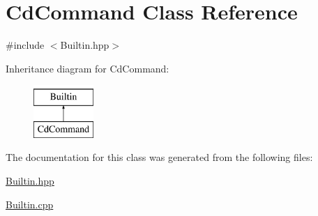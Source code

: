 \hypertarget{classCdCommand}{
\section{CdCommand Class Reference}
\label{classCdCommand}
}


{\ttfamily \#include $<$Builtin.hpp$>$}

Inheritance diagram for CdCommand:\begin{figure}[H]
\begin{center}
\leavevmode
\includegraphics[height=2.000000cm]{classCdCommand}
\end{center}
\end{figure}


The documentation for this class was generated from the following files:\begin{DoxyCompactItemize}
\item 
\hyperlink{Builtin_8hpp}{Builtin.hpp}\item 
\hyperlink{Builtin_8cpp}{Builtin.cpp}\end{DoxyCompactItemize}
